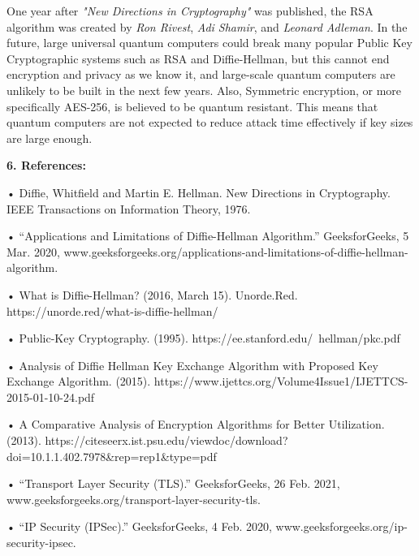 \documentclass{article}
\begin{document}
\begin{flushleft}
\hspace{0.5cm} One year after \textit{"New Directions in Cryptography"} was published, the RSA algorithm was created by \textit{Ron Rivest}, \textit{Adi Shamir}, and \textit{Leonard Adleman}. In the future, large universal quantum computers could break many popular Public Key Cryptographic systems such as RSA and Diffie-Hellman, but this cannot end encryption and privacy as we know it, and large-scale quantum computers are unlikely to be built in the next few years. Also, Symmetric encryption, or more specifically AES-256, is believed to be quantum resistant. This means that quantum computers are not expected to reduce attack time effectively if key sizes are large enough.

\vspace{5mm}

\textbf{6. References:}
\end{flushleft}

• Diffie, Whitfield and Martin E. Hellman. New Directions in Cryptography. IEEE Transactions on Information Theory, 1976.
\newline 

• “Applications and Limitations of Diffie-Hellman Algorithm.” GeeksforGeeks, 5 Mar. 2020, www.geeksforgeeks.org/applications-and-limitations-of-diffie-hellman-algorithm. \newline

• What is Diffie-Hellman? (2016, March 15). Unorde.Red. https://unorde.red/what-is-diffie-hellman/ \newline

• Public-Key Cryptography. (1995). https://ee.stanford.edu/~hellman/pkc.pdf \newline

\vspace{1cm}

• Analysis of Diffie Hellman Key Exchange Algorithm with Proposed Key Exchange Algorithm. (2015). https://www.ijettcs.org/Volume4Issue1/IJETTCS-2015-01-10-24.pdf \newline

• A Comparative Analysis of Encryption Algorithms for Better Utilization. (2013). https://citeseerx.ist.psu.edu/viewdoc/download?doi=10.1.1.402.7978&rep=rep1&type=pdf\newline

• “Transport Layer Security (TLS).” GeeksforGeeks, 26 Feb. 2021, \newline www.geeksforgeeks.org/transport-layer-security-tls. \newline

• “IP Security (IPSec).” GeeksforGeeks, 4 Feb. 2020, www.geeksforgeeks.org/ip-security-ipsec.\newline
\end{document}

